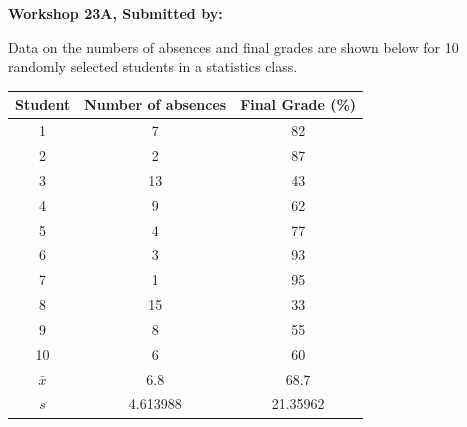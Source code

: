 \documentclass[11pt, chapterprefix=true]{scrbook}\usepackage[]{graphicx}\usepackage[]{color}
\begin{document}
\begin{exercises}
\begin{exercise}
\end{exercise}
\begin{solution}  %

\end{solution}

\clearpage

    \begin{exercise}  %

    \begin{center}
\begin{flushleft}\textbf{\large \hfill Workshop 23A, Submitted by: }\end{flushleft}

\end{center}

Data on the numbers of absences and final grades are shown below for 10 randomly selected students in a statistics class.

\begin{center}
\begin{tabular}{@{} ccc @{}} \hline
Student &	Number of absences &	Final Grade (\%) \\ \hline
1&	7&	82 \\
2&	2&	87 \\
3&	13&	43 \\
4&	9&	62 \\
5&	4&	77 \\
6&	3&	93 \\
7&	1&	95 \\
8&	15&	33 \\
9&	8&	55 \\
10&	6&	60 \\ \hline
$\bar{x}$ & 6.8 & 68.7 \\
$s$ & 4.613988 & 21.35962 \\ \hline
\end{tabular}
\end{center}


\end{exercise}
\end{exercises}
\end{document}
